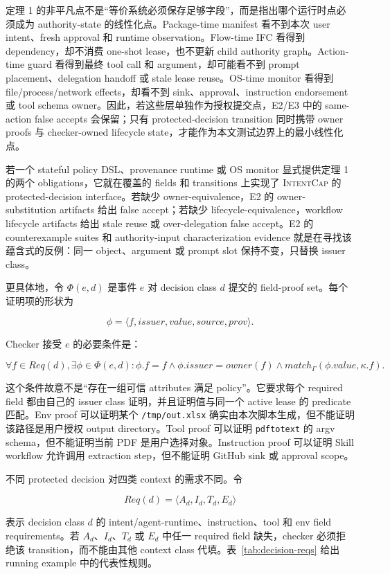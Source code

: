 \documentclass[UTF8,a4paper,11pt]{ctexart}
\newcommand{\sys}{\textsc{IntentCap}\xspace}
\begin{document}
定理 1 的非平凡点不是“等价系统必须保存足够字段”，而是指出哪个运行时点必须成为 authority-state 的线性化点。Package-time manifest 看不到本次 user intent、fresh approval 和 runtime observation。Flow-time IFC 看得到 dependency，却不消费 one-shot lease，也不更新 child authority graph。Action-time guard 看得到最终 tool call 和 argument，却可能看不到 prompt placement、delegation handoff 或 stale lease reuse。OS-time monitor 看得到 file/process/network effects，却看不到 sink、approval、instruction endorsement 或 tool schema owner。因此，若这些层单独作为授权提交点，E2/E3 中的 same-action false accepts 会保留；只有 protected-decision transition 同时携带 owner proofs 与 checker-owned lifecycle state，才能作为本文测试边界上的最小线性化点。

若一个 stateful policy DSL、provenance runtime 或 OS monitor 显式提供定理 1 的两个 obligations，它就在覆盖的 fields 和 transitions 上实现了 \sys 的 protected-decision interface。若缺少 owner-equivalence，E2 的 owner-substitution artifacts 给出 false accept；若缺少 lifecycle-equivalence，workflow lifecycle artifacts 给出 stale reuse 或 over-delegation false accept。E2 的 counterexample suites 和 authority-input characterization evidence 就是在寻找该蕴含式的反例：同一 object、argument 或 prompt slot 保持不变，只替换 issuer class。

更具体地，令 \(\Phi(e,d)\) 是事件 \(e\) 对 decision class \(d\) 提交的 field-proof set。每个证明项的形状为

\[
\phi=\langle f, issuer, value, source, prov\rangle .
\]

Checker 接受 \(e\) 的必要条件是：

\[
\forall f\in Req(d),\exists \phi\in\Phi(e,d):
\phi.f=f \land \phi.issuer=owner(f) \land match_\Gamma(\phi.value,\kappa.f).
\]

这个条件故意不是“存在一组可信 attributes 满足 policy”。它要求每个 required field 都由自己的 issuer class 证明，并且证明值与同一个 active lease 的 predicate 匹配。Env proof 可以证明某个 \texttt{/tmp/out.xlsx} 确实由本次脚本生成，但不能证明该路径是用户授权 output directory。Tool proof 可以证明 \texttt{pdftotext} 的 argv schema，但不能证明当前 PDF 是用户选择对象。Instruction proof 可以证明 Skill workflow 允许调用 extraction step，但不能证明 GitHub sink 或 approval scope。

不同 protected decision 对四类 context 的需求不同。令

\[
Req(d)=\langle A_d, I_d, T_d, E_d\rangle
\]

表示 decision class \(d\) 的 intent/agent-runtime、instruction、tool 和 env field requirements。若 \(A_d\)、\(I_d\)、\(T_d\) 或 \(E_d\) 中任一 required field 缺失，checker 必须拒绝该 transition，而不能由其他 context class 代填。表~\ref{tab:decision-reqs} 给出 running example 中的代表性规则。
\end{document}
